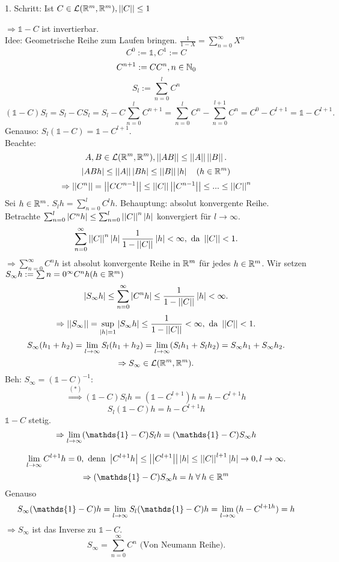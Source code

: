 \documentclass[../ana2.tex]{subfiles}
\begin{document}
\begin{bew}
    1. Schritt: Ist \(C \in \mathcal{L}(\mathbb{R}^m, \mathbb{R}^m), \left|\left|C\right|\right| \leq 1\)

    \( \Rightarrow \mathds{1} - C \) ist invertierbar.\\
    Idee: Geometrische Reihe zum Laufen bringen. \( \frac{1}{1-X} = \sum_{n=0}^\infty X^n \)
    \[ C^0 := \mathds{1}, C^1 := C\]
    \[ C^{n+1} := C C^n, n \in \mathbb{N}_0 \]
    \[ S_l := \sum_{n=0}^l C^n \]
    \[ (\mathds{1} - C)S_l = S_l - C S_l 
    = S_l - C \sum_{n=0}^l C^{n+1} 
    = \sum_{n=0}^l C^{n} - \sum_{n=0}^{l+1} C^n
    = C^0 - C^{l+1} = \mathds{1} - C^{l+1}. \tag{\(*\)}\]
    Genauso: \( S_l(\mathds{1} - C) = \mathds{1} - C^{l+1} \).\\
    Beachte: \[A, B \in \mathcal{L}(\mathbb{R}^m, \mathbb{R}^m), 
    \left|\left|A B\right|\right| \leq \left|\left|A\right|\right| \left|\left|B\right|\right|. \]
    \[\left|ABh\right| \leq \left|\left|A\right|\right| \left|Bh\right| \leq \left|\left|B\right|\right| \left|h\right| \quad (h \in \mathbb{R}^m) \]
    \[\Rightarrow \left|\left|C^n\right|\right| = \left|\left|C C^{n-1}\right|\right| \leq \left|\left|C\right|\right| \left|\left|C^{n-1}\right|\right|
    \leq ... \leq \left|\left|C\right|\right|^n\]
    Sei \(h \in \mathbb{R}^m\). \( S_l h = \sum_{n=0}^l C^l h \).
    Behauptung: absolut konvergente Reihe.\\
    Betrachte \( \sum_{n=0}^l \left| C^n h \right| 
    \leq \sum_{n=0}^l \left|\left|C\right|\right|^n \left|h\right| \) konvergiert für \( l \rightarrow \infty \).
    \[ \sum_{n=0}^\infty \left|\left|C\right|\right|^n \left|h\right| \frac{1}{1 - \left|\left|C\right|\right|} \left|h\right| < \infty, 
    \text{ da } \left|\left|C\right|\right| < 1. \]
    \( \Rightarrow \sum_{n=0}^\infty C^n h \) ist absolut konvergente Reihe in
    \( \mathbb{R}^m \) für jedes \( h \in \mathbb{R}^m \).
    Wir setzen \( S_\infty h := \sum{n=0}^\infty C^n h (h \in \mathbb{R}^m)\)
    \[ \left| S_\infty h \right| \leq \sum_{n=0}^\infty \left| C^n h \right| 
    \leq \frac{1}{1 - \left|\left|C\right|\right|}\left|h\right| < \infty. \]
    \[ \Rightarrow \left|\left|S_\infty\right|\right| = \underset{\left|h\right| = 1}{\sup} 
    \left| S_\infty h \right| \leq \frac{1}{1 - \left|\left|C\right|\right|} < \infty, 
    \text{ da } \left|\left|C\right|\right| < 1. \]
    \[ S_\infty(h_1 + h_2) 
    = \lim\limits_{l\rightarrow\infty} S_l(h_1 + h_2) 
    = \lim\limits_{l\rightarrow\infty} (S_l h_1 + S_l h_2)
    = S_\infty h_1 + S_\infty h_2. \]
    \[ \Rightarrow S_\infty \in \mathcal{L}(\mathbb{R}^m, \mathbb{R}^m). \]
    Beh: \( S_\infty = (\mathds{1} -C)^{-1} \): 
    \[ \overset{(*)}{\Rightarrow}  ( \mathds{1} - C)S_l h = (\mathds{1} - C^{l+1})h 
    = h - C^{l+1}h \]
    \[ S_l (\mathds{1} - C) h = h - C^{l+1}h \]
    \( \mathds{1} - C \) stetig.
    \[\Rightarrow \limes{l} (\mathds{1}-C) S_lh = (\mathds{1}-C) S_\infty h\]

    \[ \lim\limits_{l\rightarrow\infty} C^{l+1} h = 0, \text{ denn } \left|C^{l+1}h\right| \leq \left|\left|C^{l+1}\right|\right| 
    \left|h\right| \leq \left|\left|C\right|\right|^{l+1} \left|h\right| \rightarrow 0, l \rightarrow \infty. \]
    \[ \Rightarrow (\mathds{1} - C) S_\infty h = h \;\forall h \in \R^m \]
    Genauso \[S_\infty(\mathds{1}-C)h = \limes{l} S_l(\mathds{1}-C)h 
    = \limes{l}(h-C^{l+1 h}) = h\]
    \( \Rightarrow S_\infty \) ist das Inverse zu \( \mathds{1} - C \). 
    \[ S_\infty = \sum_{n=0}^\infty C^n \text{ (Von Neumann Reihe)}. \]
    

\end{bew}
\end{document}
